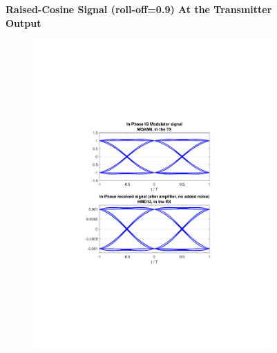 \begin{refsection}
\begin{table}[H]
\begin{tabular}{|l|l|}
	\end{tabular}
\end{table}

\begin{figure}[H]
	\centering
	\textbf{Raised-Cosine Signal (roll-off=0.9) At the Transmitter Output}
	\begin{subfigure}{.5\textwidth}
		\centering
		\includegraphics[clip, trim=4cm 7cm 4cm 7cm, width=\textwidth]{./sdf/m_qam_system/figures/eyes/simulRc09Sp60Np00NoMF_i.pdf}
	\end{subfigure}%
	\begin{subfigure}{.5\textwidth}
		\centering

\end{subfigure}
\end{figure}
\end{refsection}
